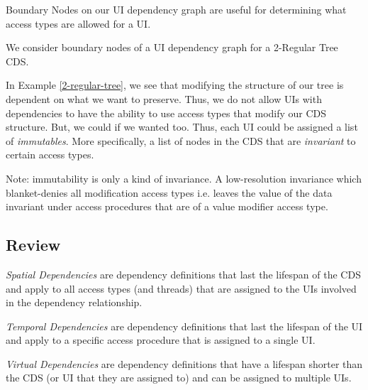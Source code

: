 Boundary Nodes on our UI dependency graph are useful for determining what access types are allowed for a UI.

\begin{con-def}[Boundaries]
	\label{boundaries}
\end{con-def}

\begin{con-ex} 
	\label{2-regular-tree}
	We consider boundary nodes of a UI dependency graph for a 2-Regular Tree CDS.
\end{con-ex}

In Example \ref{2-regular-tree}, we see that modifying the structure of our tree is dependent on what we want to preserve. Thus, we do not allow UIs with dependencies to have the ability to use access types that modify our CDS structure. But, we could if we wanted too. Thus, each UI could be assigned a list of \textit{immutables}. More specifically, a list of nodes in the CDS that are \textit{invariant} to certain access types.

Note: immutability is only a kind of invariance. A low-resolution invariance which blanket-denies all modification access types i.e. leaves the value of the data invariant under access procedures that are of a value modifier access type.

\subsection{Review}

\textit{Spatial Dependencies} are dependency definitions that last the lifespan of the CDS and apply to all access types (and threads) that are assigned to the UIs involved in the dependency relationship.

\textit{Temporal Dependencies} are dependency definitions that last the lifespan of the UI and apply to a specific access procedure that is assigned to a single UI.

\textit{Virtual Dependencies} are dependency definitions that have a lifespan shorter than the CDS (or UI that they are assigned to) and can be assigned to multiple UIs.





